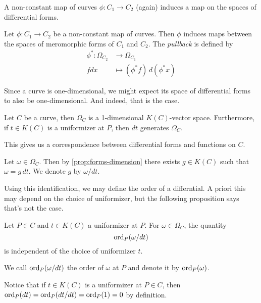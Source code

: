 A non-constant map of curves $\phi:C_1 \to C_2$ (again) induces a map
on the spaces of differential forms.

\begin{definition}
	Let $\phi: C_1 \to C_2$ be a non-constant map of curves. Then $\phi$ induces
	maps between the spaces of meromorphic forms of $C_1$ and $C_2$.
	The \emph{pullback} is defined by
	\begin{align*}
		\phi^*: \Omega_{C_2} &\to \Omega_{C_1}\\
		fdx &\mapsto (\phi^* f)\,d(\phi^* x)
	\end{align*}
\end{definition}

Since a curve is one-dimensional, we might expect its space of differential
forms to also be one-dimensional. And indeed, that is the case.

\begin{proposition}
	\label{prop:forms-dimension}
	Let $C$ be a curve, then $\Omega_C$ is a 1-dimensional $K(C)$-vector space.
	Furthermore, if $t \in K(C)$ is a uniformizer at $P$,
	then $dt$ generates $\Omega_C$.
\end{proposition}

This gives us a correspondence between differential forms and functions
on $C$.

\begin{notation}
	Let $\omega \in \Omega_C$. Then by \ref{prop:forms-dimension} there exists
	$g \in K(C)$ such that $\omega = g\,dt$. We denote $g$ by $\omega/dt$.
\end{notation}

Using this identification, we may define the order of a differntial.
A priori this may depend on the choice of uniformizer, but the following
proposition says that's not the case.
\begin{proposition}
	Let $P \in C$ and $t \in K(C)$ a uniformizer at $P$. For $\omega \in
	\Omega_C$,
	the quantity
	\begin{equation*}
		\operatorname{ord}_P(\omega/dt)
	\end{equation*}
	is independent of the choice of uniformizer $t$.
\end{proposition}

\begin{definition}
	We call $\operatorname{ord}_P(\omega/dt)$ the order of $\omega$ at $P$ and denote it by
	$\operatorname{ord}_P(\omega)$.
\end{definition}

Notice that if $t \in K(C)$ is a uniformizer at $P \in C$, then
$\operatorname{ord}_P(dt) = \operatorname{ord}_P(dt/dt) = \operatorname{ord}_P(1) = 0$ by definition.

